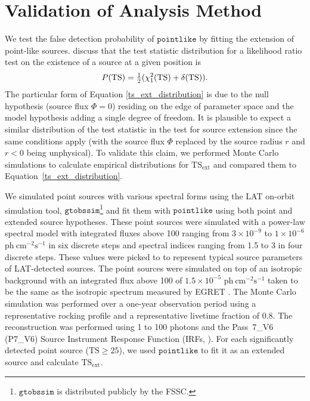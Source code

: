 \documentclass[12pt,preprint]{aastex}
\newcommand{\mev}{\text{MeV}\xspace}
\newcommand{\gev}{\text{GeV}\xspace}
\newcommand{\s}{\text{s}\xspace}
\newcommand{\ph}{\text{ph}\xspace}
\newcommand{\cm}{\text{cm}\xspace}
\newcommand{\phflux}{\ensuremath{\ph\ \cm^{-2}\s^{-1}}\xspace}
\newcommand{\tsext}{{\ensuremath{\text{TS}_{\text{ext}}}}\xspace}
\newcommand{\ts}{\text{TS}\xspace}
\newcommand{\pointlike}{\ensuremath{\mathtt{pointlike}}\xspace}
\newcommand{\gtobssim}{\ensuremath{\mathtt{gtobssim}}\xspace}
\begin{document}
\section{Validation of Analysis Method}

\label{monte_carlo_validation}

We test the false detection probability of \pointlike by fitting the extension of
point-like sources.
\cite{mattox_egret} discuss that the test statistic distribution
for a likelihood ratio test on the existence of a source at
a given position is 
\begin{equation}\label{ts_ext_distribution}
  P(\ts)=\onehalf(\chi^2_1(\ts)+\delta(\ts)).
\end{equation}
The particular form of Equation \ref{ts_ext_distribution} is
due to the null hypothesis (source flux $\Phi=0$) residing
on the edge of parameter space and the model hypothesis
adding a single degree of freedom. It is plausible to
expect a similar distribution of the test statistic
in the test for source extension since the same conditions
apply (with the source flux $\Phi$ replaced by the source radius $r$ and
$r<0$ being unphysical).
To validate this claim, we performed Monte Carlo
simulations
to calculate empirical distributions for $\tsext$ and
compared them to Equation~\ref{ts_ext_distribution}.

We simulated point sources with various spectral forms using
the LAT on-orbit simulation tool, 
\gtobssim\footnote{\gtobssim is distributed publicly by the FSSC.} and fit them with \pointlike using both point
and extended source hypotheses.  These point sources were simulated with a power-law
spectral model with integrated fluxes above 100 \mev ranging from $3\times10^{-9}$ 
to $1\times10^{-6}$ \phflux in six discrete steps and spectral
indices ranging from 1.5 to 3 in four discrete steps.  These values
were picked to to represent typical source parameters of LAT-detected
sources. The point sources were simulated on top of an isotropic
background with an integrated flux above 100 \mev of $1.5\times10^{-5}$ \phflux
taken to be the same as the isotropic spectrum measured by EGRET
\citep{sreekumar_isotropic}.  The Monte Carlo simulation was performed
over a one-year observation period using a representative rocking profile and a
representative livetime fraction of 0.8.  The reconstruction was performed
using 1 \gev to 100 \gev photons and the Pass~7\_V6 (P7\_V6) Source Instrument
Response Function (IRFs, \cite{lat_on_orbit_psf}).  For each 
significantly detected point source ($\ts\ge25$), we used \pointlike
to fit it as an extended source and calculate \tsext.
\end{document}
